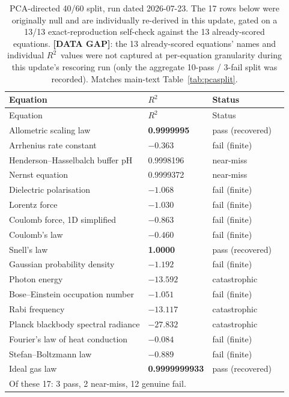 \documentclass[11pt]{article}
\newcommand{\rtwo}{$R^2$}
\newcommand{\gap}{\textcolor{purple!60!black}{\textbf{[DATA GAP]}}}
\begin{document}
\begin{longtable}{p{2.3cm}p{6.2cm}p{1.5cm}p{2.5cm}}
\caption{PCA-directed 40/60 split, run dated 2026-07-23. The 17 rows
below were originally null and are individually re-derived in this
update, gated on a 13/13 exact-reproduction self-check against the 13
already-scored equations. \gap: the 13 already-scored equations' names
and individual \rtwo\ values were not captured at per-equation
granularity during this update's rescoring run (only the aggregate
10-pass / 3-fail split was recorded). Matches main-text
Table~\ref{tab:pcasplit}.}
\label{supp:tab:pcasplit}\\
\toprule
Equation & \rtwo & Status \\
\midrule
\endfirsthead
\toprule
Equation & \rtwo & Status \\
\midrule
\endhead
Allometric scaling law & \textbf{0.9999995} & pass (recovered) \\
Arrhenius rate constant & $-0.363$ & fail (finite) \\
Henderson--Hasselbalch buffer pH & 0.9998196 & near-miss \\
Nernst equation & 0.9999372 & near-miss \\
Dielectric polarisation & $-1.068$ & fail (finite) \\
Lorentz force & $-1.030$ & fail (finite) \\
Coulomb force, 1D simplified & $-0.863$ & fail (finite) \\
Coulomb's law & $-0.460$ & fail (finite) \\
Snell's law & \textbf{1.0000} & pass (recovered) \\
Gaussian probability density & $-1.192$ & fail (finite) \\
Photon energy & $-13.592$ & catastrophic \\
Bose--Einstein occupation number & $-1.051$ & fail (finite) \\
Rabi frequency & $-13.117$ & catastrophic \\
Planck blackbody spectral radiance & $-27.832$ & catastrophic \\
Fourier's law of heat conduction & $-0.084$ & fail (finite) \\
Stefan--Boltzmann law & $-0.889$ & fail (finite) \\
Ideal gas law & \textbf{0.9999999933} & pass (recovered) \\
\midrule
\multicolumn{3}{l}{Of these 17: 3 pass, 2 near-miss, 12 genuine fail.} \\
\bottomrule
\end{longtable}
\end{document}
